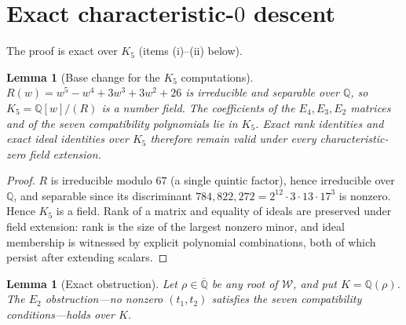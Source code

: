 \documentclass[a4paper,11pt]{article}
\theoremstyle{plain}
\newtheorem{lemma}[theorem]{Lemma}
\theoremstyle{definition}
\theoremstyle{remark}
\begin{document}
\section{Exact characteristic-\texorpdfstring{$0$}{0} descent}\label{sec:lifting}

The proof is exact over $K_5$ (items (i)--(ii) below).

\begin{lemma}[Base change for the $K_5$ computations]\label{lem:basechange}
$R(w)=w^5-w^4+3w^3+3w^2+26$ is irreducible and separable over $\mathbb{Q}$, so $K_5=\mathbb{Q}[w]/(R)$ is a number field. The coefficients of the $E_4,E_3,E_2$ matrices and of the seven compatibility polynomials lie in $K_5$. Exact rank identities and exact ideal identities over $K_5$ therefore remain valid under every characteristic-zero field extension.
\end{lemma}

\begin{proof}
$R$ is irreducible modulo $67$ (a single quintic factor), hence irreducible over $\mathbb{Q}$, and separable since its discriminant $784{,}822{,}272=2^{12}\cdot3\cdot13\cdot17^3$ is nonzero. Hence $K_5$ is a field. Rank of a matrix and equality of ideals are preserved under field extension: rank is the size of the largest nonzero minor, and ideal membership is witnessed by explicit polynomial combinations, both of which persist after extending scalars.
\end{proof}

\begin{lemma}[Exact obstruction]\label{lem:lifting}
Let $\rho\in\overline{\mathbb{Q}}$ be any root of $\mathcal{W}$, and put $K=\mathbb{Q}(\rho)$. The $E_2$ obstruction---no nonzero $(t_1,t_2)$ satisfies the seven compatibility conditions---holds over $K$.
\end{lemma}
\end{document}
